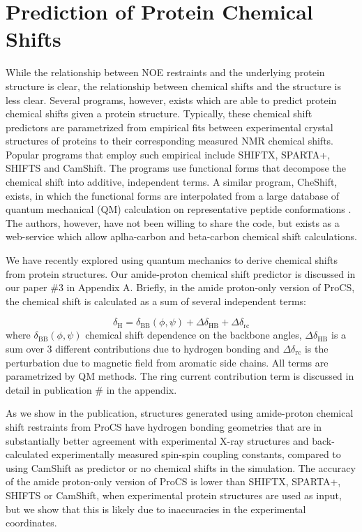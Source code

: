 \chapter{Prediction of Protein Chemical Shifts}

While the relationship between NOE restraints and the underlying protein structure is clear,
the relationship between chemical shifts and the structure is less clear.
Several programs, however, exists which are able to predict protein chemical shifts given a protein structure.
Typically, these chemical shift predictors are parametrized from empirical fits between experimental crystal structures of proteins to their corresponding measured NMR chemical shifts.
Popular programs that employ such empirical include SHIFTX, SPARTA+, SHIFTS and CamShift\cite{SHIFTX,SPARTAPLUS,Osapay1991,CamShift}.
The programs use functional forms that decompose the chemical shift into additive, independent terms.
A similar program, CheShift, exists, in which the functional forms are interpolated from a large database of quantum mechanical (QM) calculation on representative peptide conformations \cite{CheShift2}.
The authors, however, have not been willing to share the code, but exists as a web-service which allow aplha-carbon and beta-carbon chemical shift calculations.

We have recently explored using quantum mechanics to derive chemical shifts from protein structures. Our amide-proton chemical shift predictor is discussed in our paper \#3 in Appendix A.
Briefly, in the amide proton-only version of ProCS\cite{ProCS}, the chemical shift is calculated as a sum of several independent terms\cite{Parker}:

\begin{equation}
    \delta_\mathrm{H} = \delta_\mathrm{BB}(\phi,\psi) + \Delta\delta_\mathrm{HB} + \Delta\delta_\mathrm{rc}
\end{equation}
where $\delta_\mathrm{BB}(\phi,\psi)$ chemical shift dependence on the backbone angles, $\Delta\delta_\mathrm{HB}$ is a sum over 3 different contributions due to hydrogen bonding and $\Delta\delta_\mathrm{rc}$ is the perturbation due to magnetic field from aromatic side chains\cite{Christensen2011}.
All terms are parametrized by QM methods. The ring current contribution term is discussed in detail in publication \# in the appendix.

As we show in the publication, structures generated using amide-proton chemical shift restraints from ProCS have hydrogen bonding geometries that are in substantially better agreement with experimental X-ray structures and back-calculated experimentally measured spin-spin coupling constants, compared to using CamShift as predictor or no chemical shifts in the simulation.
The accuracy of the amide proton-only version of ProCS is lower than SHIFTX, SPARTA+, SHIFTS or CamShift, when experimental protein structures are used as input, but we show that this is likely due to inaccuracies in the experimental coordinates.%

